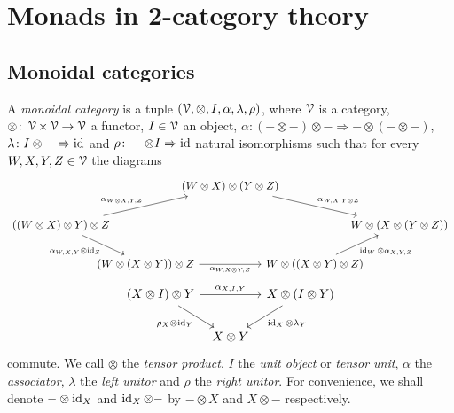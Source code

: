 \documentclass[a4paper,11pt,oneside,openany]{scrbook}
\begin{document}
\chapter{Monads in 2-category theory}

\section{Monoidal categories}

\begin{defn}
	A \emph{monoidal category} is a tuple $(\operatorname{\mathcal{V}},\otimes,I,\alpha,\lambda,\rho)$, where $\operatorname{\mathcal{V}}$ is a category, $\otimes\colon\operatorname{\mathcal{V}}\times\operatorname{\mathcal{V}}\rightarrow\operatorname{\mathcal{V}}$ a functor, $I\in\operatorname{\mathcal{V}}$ an object, $\alpha\colon(-\otimes-)\otimes-\Rightarrow-\otimes(-\otimes-)$, $\lambda\colon I\otimes-\Rightarrow\operatorname{id}$ and $\rho\colon-\otimes I\Rightarrow\operatorname{id}$ natural isomorphisms such that for every $W,X,Y,Z\in\operatorname{\mathcal{V}}$ the diagrams
	\[
		\begin{tikzcd}[column sep = -2.0em]
			& & (W \otimes X) \otimes (Y \otimes Z) \arrow[drr, "\alpha_{W, X, Y \otimes Z}"] \\
			((W \otimes X) \otimes Y) \otimes Z \arrow[urr, "\alpha_{W \otimes X, Y, Z}"] \arrow[dr,"\alpha_{W,X,Y} \otimes \id_Z", swap]
			& & & & W \otimes (X \otimes (Y \otimes Z)) \\
			& (W \otimes (X \otimes Y)) \otimes Z \arrow[rr, "\alpha_{W, X \otimes Y, Z}", swap]
			& & W \otimes ((X \otimes Y) \otimes Z) \arrow[ur, "\id_{W}\otimes\alpha_{X,Y,Z}", swap]
		\end{tikzcd}
	\]
	\[
		\begin{tikzcd}[column sep=tiny]
			(X\otimes I)\otimes Y\ar[rr, "\alpha_{X,I,Y}"]\ar[dr, "\rho_X\otimes\id_Y", swap]
			&& X\otimes (I\otimes Y)\ar[dl, "\id_X\otimes\lambda_Y"] \\
			& X\otimes Y
		\end{tikzcd}
	\]
	commute. We call $\otimes$ the \emph{tensor product}, $I$ the \emph{unit
    object} or \emph{tensor unit}, $\alpha$ the \emph{associator}, $\lambda$ the
    \emph{left unitor} and $\rho$ the \emph{right unitor}. For convenience, we
    shall denote $-\otimes\operatorname{id}_X$ and $\operatorname{id}_X\otimes -$ by $-\otimes X$ and
    $X\otimes-$ respectively.
\end{defn}
\end{document}
